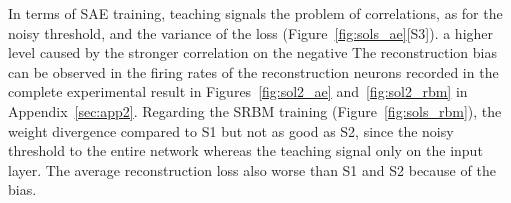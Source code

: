 In terms of SAE training, teaching signals \DIFdelbegin {}\DIFdelend \DIFaddbegin {}\DIFaddend the problem of correlations, as for the noisy threshold, and the variance of the loss \DIFdelbegin {}\DIFdelend \DIFaddbegin {}\DIFaddend (Figure~\ref{fig:sols_ae}[S3]).
\DIFdelbegin {}\DIFdelend \DIFaddbegin {}\DIFaddend a higher level \DIFdelbegin {}\DIFdelend \DIFaddbegin {}\DIFaddend caused by the stronger correlation on the negative \DIFdelbegin {}\DIFdelend \DIFaddbegin {}\DIFaddend The reconstruction bias can be observed in the firing rates of the reconstruction neurons recorded in the complete experimental result in Figures~\ref{fig:sol2_ae} and~\ref{fig:sol2_rbm} in Appendix~\ref{sec:app2}.
Regarding the SRBM training (Figure~\ref{fig:sols_rbm}), the weight divergence \DIFdelbegin {}\DIFdelend \DIFaddbegin {}\DIFaddend compared to S1 but \DIFaddbegin {}\DIFaddend not as good as S2, since the noisy threshold \DIFdelbegin {}\DIFdelend \DIFaddbegin {}\DIFaddend to the entire network whereas the teaching signal \DIFdelbegin {}\DIFdelend \DIFaddbegin {}\DIFaddend only on the input layer.
The average reconstruction loss \DIFdelbegin {}\DIFdelend \DIFaddbegin {}\DIFaddend also worse than S1 and S2 because of the bias. 

